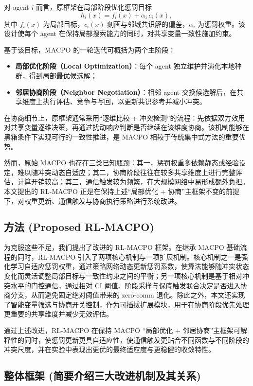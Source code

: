\documentclass[12pt]{ctexart}
\begin{document}
对 agent \(i\) 而言，原框架在局部阶段优化惩罚目标
\[
h_i(x)=f_i(x)+\alpha_i\,c_i(x),
\]
其中 \(f_i(x)\) 为局部目标，\(c_i(x)\) 刻画与邻域共识解的偏差，\(\alpha_i\) 为惩罚权重。该设计使每个 agent 在保持局部搜索能力的同时，对共享变量一致性施加约束。

基于该目标，MACPO 的一轮迭代可概括为两个主阶段：
\begin{itemize}
\item \textbf{局部优化阶段（Local Optimization）}：每个 agent 独立维护并演化本地种群，得到局部最优候选解；
\item \textbf{邻居协商阶段（Neighbor Negotiation）}：相邻 agent 交换候选解后，在共享维度上执行评估、竞争与写回，以更新共识参考并减小冲突。
\end{itemize}

在协商细节上，原框架通常采用“逐维比较 + 冲突检测”的流程：先依据双方效用对共享变量逐维决策，再通过扰动响应判断是否继续在该维度协商。该机制能够在黑箱条件下实现可行的一致性推进，是 MACPO 相较于传统集中式方法的重要优势。

然而，原始 MACPO 也存在三类已知瓶颈：其一，惩罚权重多依赖静态或经验设定，难以随冲突动态自适应；其二，协商阶段往往在较多共享维度上进行完整评估，计算开销较高；其三，通信触发较为频繁，在大规模网络中易形成额外负担。本文提出的 RL-MACPO 正是在保持上述“局部优化 + 协商”主框架不变的前提下，对权重更新、通信触发与协商执行策略进行系统改进。

\subsection{方法 (Proposed
RL-MACPO)}\label{ux65b9ux6cd5-proposed-rl-macpo}

为克服这些不足，我们提出了改进的 RL-MACPO 框架。在继承 MACPO 基础流程的同时，RL-MACPO 引入了两项核心机制与一项扩展机制。核心机制之一是强化学习自适应惩罚权重，通过策略网络动态更新惩罚系数，使算法能够随冲突状态变化而灵活调整局部目标与一致性约束之间的平衡；另一项核心机制是基于相对冲突水平的门控通信，通过相对 CI 阈值、阶段采样与保底触发联合决定是否进入协商分支，从而避免固定绝对阈值带来的 zero-comm 退化。除此之外，本文还实现了智能变量筛选与协商开关控制，作为可插拔扩展模块，用于在协商阶段优先处理更重要的共享维度并减少无效评估。

通过上述改进，RL-MACPO 在保持 MACPO “局部优化 + 邻居协商”主框架可解释性的同时，使惩罚更新更具自适应性，使通信触发更贴合不同函数与不同阶段的冲突尺度，并在实验中表现出更优的最终适应度与更稳健的收敛特性。

\subsection{整体框架
(简要介绍三大改进机制及其关系)}\label{ux6574ux4f53ux6846ux67b6-ux7b80ux8981ux4ecbux7ecdux4e09ux5927ux6539ux8fdbux673aux5236ux53caux5176ux5173ux7cfb}
\end{document}
